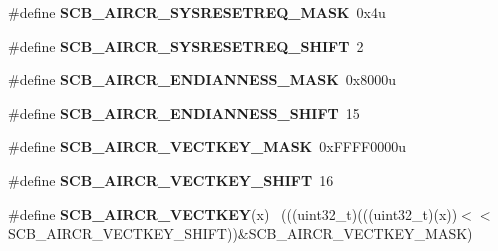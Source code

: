 \begin{DoxyCompactItemize}
\item 
\hypertarget{group___s_c_b___register___masks_gab69a066f25df4f52635379ca69f99b35}{}\#define {\bfseries S\+C\+B\+\_\+\+A\+I\+R\+C\+R\+\_\+\+S\+Y\+S\+R\+E\+S\+E\+T\+R\+E\+Q\+\_\+\+M\+A\+S\+K}~0x4u\label{group___s_c_b___register___masks_gab69a066f25df4f52635379ca69f99b35}

\item 
\hypertarget{group___s_c_b___register___masks_ga858136a0c46c0a91e00af704cb3e2eb8}{}\#define {\bfseries S\+C\+B\+\_\+\+A\+I\+R\+C\+R\+\_\+\+S\+Y\+S\+R\+E\+S\+E\+T\+R\+E\+Q\+\_\+\+S\+H\+I\+F\+T}~2\label{group___s_c_b___register___masks_ga858136a0c46c0a91e00af704cb3e2eb8}

\item 
\hypertarget{group___s_c_b___register___masks_gad1fa2d88f03b66dea86171ebb636d936}{}\#define {\bfseries S\+C\+B\+\_\+\+A\+I\+R\+C\+R\+\_\+\+E\+N\+D\+I\+A\+N\+N\+E\+S\+S\+\_\+\+M\+A\+S\+K}~0x8000u\label{group___s_c_b___register___masks_gad1fa2d88f03b66dea86171ebb636d936}

\item 
\hypertarget{group___s_c_b___register___masks_ga2ac1c32de13b48a92bc48bbcee891976}{}\#define {\bfseries S\+C\+B\+\_\+\+A\+I\+R\+C\+R\+\_\+\+E\+N\+D\+I\+A\+N\+N\+E\+S\+S\+\_\+\+S\+H\+I\+F\+T}~15\label{group___s_c_b___register___masks_ga2ac1c32de13b48a92bc48bbcee891976}

\item 
\hypertarget{group___s_c_b___register___masks_ga0929f6fe9ab80dd345abdc59f44fc492}{}\#define {\bfseries S\+C\+B\+\_\+\+A\+I\+R\+C\+R\+\_\+\+V\+E\+C\+T\+K\+E\+Y\+\_\+\+M\+A\+S\+K}~0x\+F\+F\+F\+F0000u\label{group___s_c_b___register___masks_ga0929f6fe9ab80dd345abdc59f44fc492}

\item 
\hypertarget{group___s_c_b___register___masks_ga81e3a91d7ab352abfc1227b928677c37}{}\#define {\bfseries S\+C\+B\+\_\+\+A\+I\+R\+C\+R\+\_\+\+V\+E\+C\+T\+K\+E\+Y\+\_\+\+S\+H\+I\+F\+T}~16\label{group___s_c_b___register___masks_ga81e3a91d7ab352abfc1227b928677c37}

\item 
\hypertarget{group___s_c_b___register___masks_ga40e0d3e5c8c9f49623df8ef272c987dd}{}\#define {\bfseries S\+C\+B\+\_\+\+A\+I\+R\+C\+R\+\_\+\+V\+E\+C\+T\+K\+E\+Y}(x)                                      ~(((uint32\+\_\+t)(((uint32\+\_\+t)(x))$<$$<$S\+C\+B\+\_\+\+A\+I\+R\+C\+R\+\_\+\+V\+E\+C\+T\+K\+E\+Y\+\_\+\+S\+H\+I\+F\+T))\&S\+C\+B\+\_\+\+A\+I\+R\+C\+R\+\_\+\+V\+E\+C\+T\+K\+E\+Y\+\_\+\+M\+A\+S\+K)\label{group___s_c_b___register___masks_ga40e0d3e5c8c9f49623df8ef272c987dd}


\end{DoxyCompactItemize}
